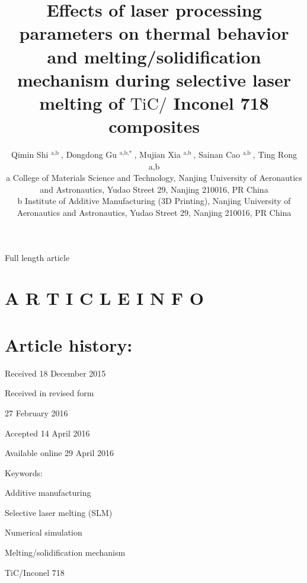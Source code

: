 \documentclass[10pt]{article}
\title{Effects of laser processing parameters on thermal behavior and melting/solidification mechanism during selective laser melting of $\mathrm{TiC} /$ Inconel 718 composites }
\author{Qimin Shi ${ }^{\text {a,b }}$, Dongdong Gu ${ }^{\text {a,b,* }}$, Mujian Xia ${ }^{\text {a,b }}$, Sainan Cao ${ }^{\text {a,b }}$, Ting Rong a,b\\
a College of Materials Science and Technology, Nanjing University of Aeronautics and Astronautics, Yudao Street 29, Nanjing 210016, PR China\\
b Institute of Additive Manufacturing (3D Printing), Nanjing University of Aeronautics and Astronautics, Yudao Street 29, Nanjing 210016, PR China}
\date{}
\begin{document}
\maketitle
Full length article



\section*{A R T I C L E I N F O}
\section*{Article history:}
Received 18 December 2015

Received in revised form

27 February 2016

Accepted 14 April 2016

Available online 29 April 2016

Keywords:

Additive manufacturing

Selective laser melting (SLM)

Numerical simulation

Melting/solidification mechanism

TiC/Inconel 718
\end{document}
